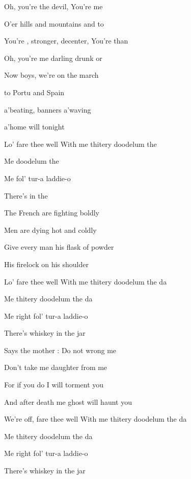 \begin{SBChorus}
Oh,  you're the devil, You're  me 

O'er hills and mountains and to 

You're , stronger, decenter, You're  than 

Oh,  you're me darling drunk or 
\end{SBChorus}

\bigskip

\begin{SBVerse*}
Now  boys, we're on the march

 to Portu and Spain

 a'beating, banners a'waving

 a'home will  tonight

Lo' fare thee well With me thitery doodelum the 

Me  doodelum the 

Me  fol' tur-a laddie-o

There's  in the 
\end{SBVerse*}

\bigskip

The French are fighting boldly

Men are dying hot and coldly

Give every man his flask of powder

His firelock on his shoulder

Lo' fare thee well With me thitery doodelum the da

Me thitery doodelum the da

Me right fol' tur-a laddie-o

There's whiskey in the jar

\bigskip

Says the mother : \og Do not wrong me

Don't take me daughter from me

For if you do I will torment you

And after death me ghost will haunt you \fg

We're off, fare thee well With me thitery doodelum the da

Me thitery doodelum the da

Me right fol' tur-a laddie-o

There's whiskey in the jar
